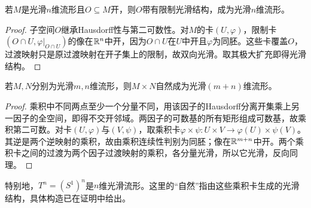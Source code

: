 \begin{theorem}[开子流形]
若$M$是光滑$n$维流形且$O\subseteq M$开，则$O$带有限制光滑结构，成为光滑$n$维流形。
\end{theorem}
\begin{proof}
子空间$O$继承Hausdorff性与第二可数性。对$M$的卡$(U,\varphi)$，限制卡$(O\cap U,\varphi|_{O\cap U})$的像在$\mathbb{R}^n$中开，因为$O\cap U$在$U$中开且$\varphi$为同胚。这些卡覆盖$O$，过渡映射只是原过渡映射在开子集上的限制，故双向光滑。取其极大扩充即得光滑结构。
\end{proof}
\begin{theorem}[乘积流形]
若$M,N$分别为光滑$m,n$维流形，则$M\times N$自然成为光滑$(m+n)$维流形。
\end{theorem}
\begin{proof}
乘积中不同两点至少一个分量不同，用该因子的Hausdorff分离开集乘上另一因子的全空间，即得不交开邻域。两因子的可数基的所有矩形组成可数基，故乘积第二可数。对卡$(U,\varphi)$与$(V,\psi)$，取乘积卡$\varphi\times\psi:U\times V\to\varphi(U)\times\psi(V)$。其逆是两个逆映射的乘积，故由乘积连续性判别为同胚；像在$\mathbb{R}^{m+n}$中开。两个乘积卡之间的过渡为两个因子过渡映射的乘积，各分量光滑，所以它光滑，反向同理。
\end{proof}
特别地，$T^n=(S^1)^n$是$n$维光滑流形。这里的“自然”指由这些乘积卡生成的光滑结构，具体构造已在证明中给出。


